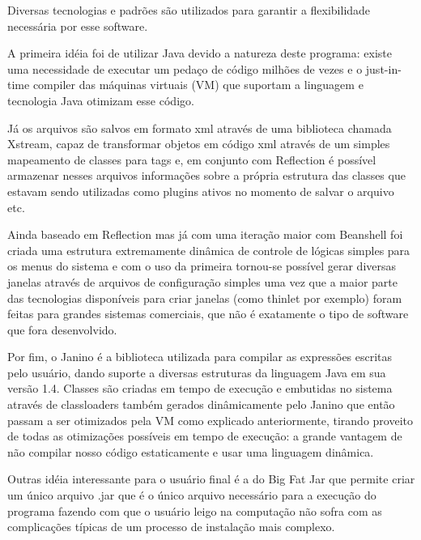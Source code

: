\documentclass[a4paper,12pt]{article}
\begin{document}
{
Diversas tecnologias e padr\~oes s\~ao utilizados para garantir a
flexibilidade necess\'aria por esse software.}

{
 A primeira id\'eia foi de utilizar Java devido a natureza deste
programa: existe uma necessidade de executar um peda\c{c}o de c\'odigo
milh\~oes de vezes e o just{}-in{}-time compiler das m\'aquinas
virtuais (VM) que suportam a linguagem e tecnologia Java otimizam esse
c\'odigo.}

{
 J\'a os arquivos s\~ao salvos em formato xml atrav\'es de uma
biblioteca chamada Xstream, capaz de transformar objetos em c\'odigo
xml atrav\'es de um simples mapeamento de classes para tags e, em
conjunto com Reflection \'e poss\'ivel armazenar nesses arquivos
informa\c{c}\~oes sobre a pr\'opria estrutura das classes que estavam
sendo utilizadas como plugins ativos no momento de salvar o arquivo
etc.}

{
 Ainda baseado em Reflection mas j\'a com uma itera\c{c}\~ao maior com
Beanshell foi criada uma estrutura extremamente din\^amica de controle
de l\'ogicas simples para os menus do sistema e com o uso da primeira
tornou{}-se poss\'ivel gerar diversas janelas atrav\'es de arquivos de
configura\c{c}\~ao simples uma vez que a maior parte das tecnologias
dispon\'iveis para criar janelas (como thinlet por exemplo) foram
feitas para grandes sistemas comerciais, que n\~ao \'e exatamente o
tipo de software que fora desenvolvido.}

{
 Por fim, o Janino \'e a biblioteca utilizada para compilar as
express\~oes escritas pelo usu\'ario, dando suporte a diversas
estruturas da linguagem Java em sua vers\~ao 1.4. Classes s\~ao criadas
em tempo de execu\c{c}\~ao e embutidas no sistema atrav\'es de
classloaders tamb\'em gerados din\^amicamente pelo Janino que ent\~ao
passam a ser otimizados pela VM como explicado anteriormente, tirando
proveito de todas as otimiza\c{c}\~oes poss\'iveis em tempo de
execu\c{c}\~ao: a grande vantagem de n\~ao compilar nosso c\'odigo
estaticamente e usar uma linguagem din\^amica.}

{
 Outras id\'eia interessante para o usu\'ario final \'e a do Big Fat Jar
que permite criar um \'unico arquivo .jar que \'e o \'unico arquivo
necess\'ario para a execu\c{c}\~ao do programa fazendo com que o
usu\'ario leigo na computa\c{c}\~ao n\~ao sofra com as
complica\c{c}\~oes t\'ipicas de um processo de instala\c{c}\~ao mais
complexo.}
\end{document}
